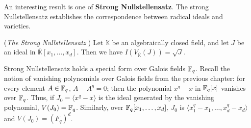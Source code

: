 %

An interesting result is one of {\bf Strong 
Nullstellensatz}.
The strong
Nullstellensatz establishes the correspondence between radical ideals
and varieties. 

\begin{Theorem}\label{thm:sns}
({\it The Strong Nullstellensatz} \cite{gb_book}) 
Let $\overline{\mathbb{K}}$ be an algebraically closed field, and let $J$
be an ideal in $\overline{\mathbb{K}}[x_1,\dots, x_d]$. 
Then we have $I(V_{\overline{\mathbb{K}}}(J)) =\sqrt{J}$. 
\end{Theorem}


Strong Nullstellensatz holds a special form over Galois fields ${\mathbb{F}}_{q}$.
Recall the notion of vanishing polynomials over Galois fields from the 
previous chapter: for every element $A \in {\mathbb{F}}_{q}$, $A-A^q = 0$; then the 
polynomial $x^q-x$ in ${\mathbb{F}}_{q}[x]$ vanishes over ${\mathbb{F}}_{q}$. Thus, if 
$J_0=\langle x^q-x \rangle$ is the ideal generated by the vanishing 
polynomial, $V(J_0)={\mathbb{F}}_{q}$. Similarly, over ${\mathbb{F}}_{q}[x_1,\dots,x_d]$, $J_0$ is 
$\langle x_1^q-x_1,\dots,x_d^q-x_d \rangle$ and $V(J_0)=(F_q)^d$.


